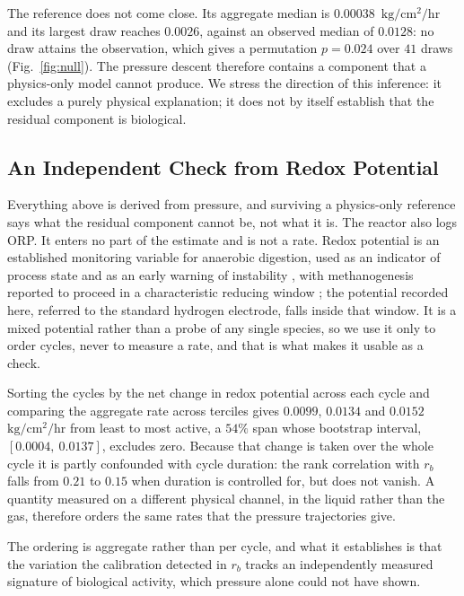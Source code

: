 \documentclass[runningheads]{llncs}
\newcommand{\ratu}{\ensuremath{\mathrm{kg/cm^{2}/hr}}}
\newcommand{\rb}{\ensuremath{r_{b}}}
\begin{document}
The reference does not come close. Its aggregate median is
$0.00038$~\ratu{} and its largest draw reaches $0.0026$, against an
observed median of $0.0128$: no draw attains the observation, which
gives a permutation $p=0.024$ over $41$ draws
(Fig.~\ref{fig:null}). The pressure descent therefore contains a
component that a physics-only model cannot produce. We stress the
direction of this inference: it excludes a purely physical explanation;
it does not by itself establish that the residual component is
biological.

\subsection{An Independent Check from Redox Potential}

Everything above is derived from pressure, and surviving a
physics-only reference says what the residual component cannot be, not
what it is. The reactor also logs ORP. It
enters no part of the estimate and is not a rate. Redox potential is an
established monitoring variable for anaerobic digestion, used as an
indicator of process state and as an early warning of instability
\cite{ao2021role}, with methanogenesis reported to proceed in a
characteristic reducing window \cite{vongvichiankul2017relationship};
the potential recorded here, referred to the standard hydrogen
electrode, falls inside that window. It is a mixed potential rather
than a probe of any single species, so we use it only to order cycles,
never to measure a rate, and that is what makes it usable as a check.

Sorting the cycles by the net change in redox potential across each
cycle and comparing the aggregate rate across terciles gives $0.0099$,
$0.0134$ and $0.0152$~\ratu{} from least to most active, a $54\%$ span
whose bootstrap interval, $[0.0004,\ 0.0137]$, excludes zero. Because
that change is taken over the whole cycle it is partly confounded with
cycle duration: the rank correlation with $\rb$ falls from $0.21$ to
$0.15$ when duration is controlled for, but does not vanish. A quantity
measured on a different physical channel, in the liquid rather than the
gas, therefore orders the same rates that the pressure trajectories
give.

The ordering is aggregate rather than per cycle, and what it
establishes is that the variation the calibration detected in $\rb$
tracks an independently measured signature of biological activity,
which pressure alone could not have shown.
\end{document}
